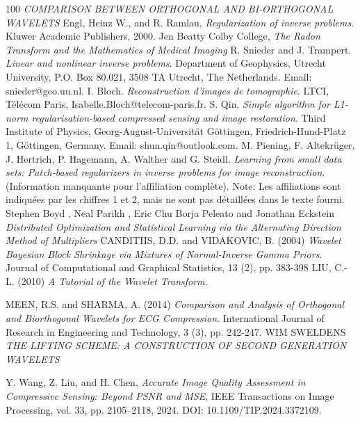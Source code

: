\documentclass[12pt, a4paper, oneside]{extbook}
\numberwithin{equation}{chapter}
\theoremstyle{definition}
\begin{document}
    
    \begin{thebibliography}{100}
         \emph{COMPARISON BETWEEN ORTHOGONAL AND BI-ORTHOGONAL WAVELETS}
          Engl, Heinz W., and R. Ramlau, \emph{Regularization of inverse problems}. Kluwer Academic Publishers, 2000.
         Jen Beatty Colby College, \emph{The Radon Transform and the Mathematics of Medical Imaging}
         R. Snieder and J. Trampert. \emph{Linear and nonlinear inverse problems}. Department of Geophysics, Utrecht University, P.O. Box 80.021, 3508 TA Utrecht, The Netherlands. Email: snieder@geo.uu.nl.
         I. Bloch. \emph{Reconstruction d’images de tomographie}. LTCI, Télécom Paris, Isabelle.Bloch@telecom-paris.fr.
         S. Qin. \emph{Simple algorithm for L1-norm regularisation-based compressed sensing and image restoration}. Third Institute of Physics, Georg-August-Universität Göttingen, Friedrich-Hund-Platz 1, Göttingen, Germany. Email: shun.qin@outlook.com.
         M. Piening, F. Altekrüger, J. Hertrich, P. Hagemann, A. Walther and G. Steidl. \emph{Learning from small data sets: Patch-based regularizers in inverse problems for image reconstruction}. (Information manquante pour l’affiliation complète). Note: Les affiliations sont indiquées par les chiffres 1 et 2, mais ne sont pas détaillées dans le texte fourni.
         Stephen Boyd , Neal Parikh , Eric Chu Borja Peleato and Jonathan Eckstein \emph{Distributed Optimization and Statistical Learning via the Alternating Direction Method of Multipliers}
        CANDITIIS, D.D. and VIDAKOVIC, B. (2004) \emph { Wavelet Bayesian Block Shrinkage via Mixtures of Normal-Inverse Gamma Priors}. Journal of Computational and Graphical Statistics, 13 (2), pp. 383-398
         LIU, C.-L. (2010) \emph{A Tutorial of the Wavelet Transform}.
        
        MEEN, R.S. and SHARMA, A. (2014) \emph{Comparison and Analysis of Orthogonal and Biorthogonal Wavelets for ECG Compression}. International Journal of Research in Engineering and Technology, 3 (3), pp. 242-247.
         WIM SWELDENS \emph{THE LIFTING SCHEME: A CONSTRUCTION OF SECOND GENERATION WAVELETS}

         Y. Wang, Z. Liu, and H. Chen, \emph{Accurate Image Quality Assessment in Compressive Sensing: Beyond PSNR and MSE}, IEEE Transactions on Image Processing, vol. 33, pp. 2105--2118, 2024. DOI: 10.1109/TIP.2024.3372109.


\end{thebibliography}
\end{document}
